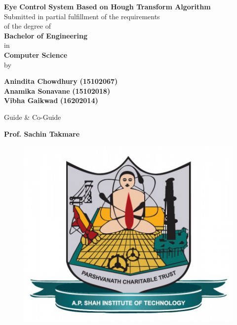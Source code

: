 \begin{titlepage}
\vspace*{0.25cm}
{\centering
{\Large\textbf {Eye Control System Based on Hough Transform
Algorithm}}\\
\vspace{1cm}
 Submitted in partial fulfillment of the requirements\\
of the degree of\\ \vspace{1cm}
{\large\textbf {Bachelor of Engineering}}\\
\vspace{0.5cm}
in \\
\vspace{0.5cm}
{\large\textbf {Computer Science}}\\
\vspace{0.5cm}
by\\
\vspace{0.5cm}

{\large \textbf {Anindita Chowdhury}} {\large \textbf {(15102067)}}\\
\vspace{0.2cm}
{\large \textbf {Anamika Sonavane}} {\large \textbf {(15102018)}}\\
\vspace{0.2cm}
{\large \textbf {Vibha Gaikwad}} {\large \textbf {(16202014)}}\\
\vspace{1cm}

Guide \& Co-Guide\\ 
\vspace{0.3cm}

\hspace{.05cm} {\large \textbf {Prof. Sachin Takmare}}\\
\vspace{1.5cm}
\begin{figure}[h]
\centering
\includegraphics[scale=0.30]{apsit_logo.jpg}
\end{figure}

}
\end{titlepage}

